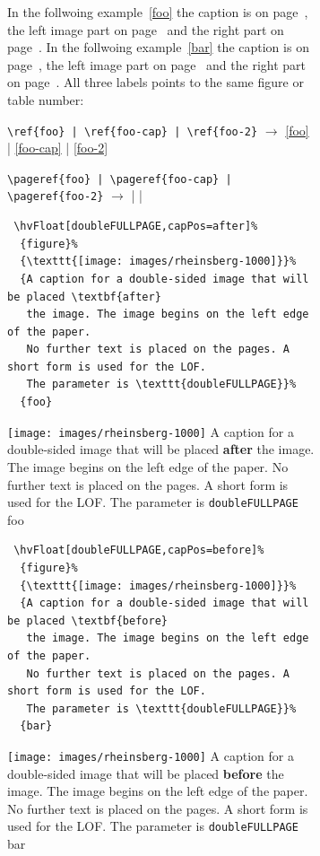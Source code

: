 \documentclass[twoside,paper=a4,usegeometry]{scrartcl}
\makeatletter
\let\hvBlindtext\Blindtext
\def\Blindtext{\par\color{black!40}\hvBlindtext\par\normalcolor}
\def\hvblindtext{\textcolor{black!40}{\blindtext@text}}
\makeatother
\begin{document}
\begin{figure}[p]
\begin{figure}[p]
In the follwoing example~\ref{foo} the caption is on page~\pageref{foo-cap}, the left image part on page~\pageref{foo}
and the right part on page~\pageref{foo-2}. In the follwoing example~\ref{bar} the caption is on page~\pageref{bar-cap}, the left image part on page~\pageref{bar}
and the right part on page~\pageref{bar-2}. All three labels points to the same figure or table number:

\verb/\ref{foo} | \ref{foo-cap} | \ref{foo-2}/ $\rightarrow$ \ref{foo} | \ref{foo-cap} | \ref{foo-2}

\verb/\pageref{foo} | \pageref{foo-cap} | \pageref{foo-2}/ $\rightarrow$ \pageref{foo} | \pageref{foo-cap} | \pageref{foo-2}

\begin{lstlisting}
 \hvFloat[doubleFULLPAGE,capPos=after]%
  {figure}%
  {\texttt{[image: images/rheinsberg-1000]}}%
  {A caption for a double-sided image that will be placed \textbf{after} 
   the image. The image begins on the left edge of the paper. 
   No further text is placed on the pages. A short form is used for the LOF. 
   The parameter is \texttt{doubleFULLPAGE}}%
  {foo}
\end{lstlisting}

\hvFloatSetDefaults

  {\texttt{[image: images/rheinsberg-1000]}}%
  {A caption for a double-sided image that will be placed \textbf{after}
   the image. The image begins on the left edge of the paper. 
   No further text is placed on the pages. A short form is used for the LOF. 
   The parameter is \texttt{doubleFULLPAGE}}%
  {foo}

\Blindtext %

\hvblindtext

\hvblindtext

\Blindtext

\Blindtext

\begin{lstlisting}
 \hvFloat[doubleFULLPAGE,capPos=before]%
  {figure}%
  {\texttt{[image: images/rheinsberg-1000]}}%
  {A caption for a double-sided image that will be placed \textbf{before} 
   the image. The image begins on the left edge of the paper. 
   No further text is placed on the pages. A short form is used for the LOF. 
   The parameter is \texttt{doubleFULLPAGE}}%
  {bar}
\end{lstlisting}

  {\texttt{[image: images/rheinsberg-1000]}}%
  {A caption for a double-sided image that will be placed \textbf{before}
   the image. The image begins on the left edge of the paper. 
   No further text is placed on the pages. A short form is used for the LOF. 
   The parameter is \texttt{doubleFULLPAGE}}%
  {bar}


\end{figure}
\end{figure}
\end{document}
